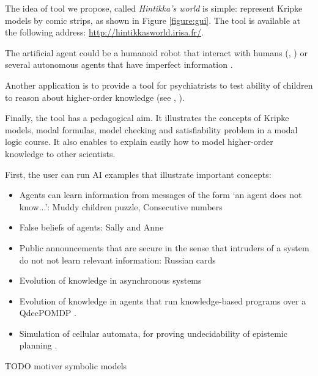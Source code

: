 \documentclass{article}
\begin{document}
The idea of tool we propose, called \emph{Hintikka's world} is simple: represent Kripke models by comic strips, as shown in Figure \ref{figure:gui}. The tool is available at the following address:
\url{http://hintikkasworld.irisa.fr/}. 

The artificial agent could be a humanoid robot that interact with humans (\cite{DBLP:journals/arobots/Scassellati02}, \cite{DBLP:conf/hri/DevinA16}) or several autonomous agents that have imperfect information \cite{AAAI2018kbps}.


Another application is to provide a tool for psychiatrists to test ability of children to reason about higher-order knowledge (see \cite{DBLP:conf/cogsci/ArslanVTH15}, \cite{wimmer1983beliefs}).

Finally, the tool has a pedagogical aim. It illustrates the concepts of Kripke models, modal formulas, model checking and satisfiability problem in a modal logic course. It also enables to explain easily 
how to model higher-order knowledge to other scientists.

First, the user can run AI examples that illustrate important concepts:

\begin{itemize}
	\item Agents can learn information from messages of the form `an agent does not know...': Muddy children puzzle, Consecutive numbers \cite{van2015one}
	\item False beliefs of agents: Sally and Anne \cite{wimmer1983beliefs}
	\item Public announcements that are secure in the sense that intruders of a system do not not learn relevant information: Russian cards \cite{DBLP:journals/sLogica/Ditmarsch03}
	\item Evolution of knowledge in asynchronous systems \cite{knight_maubert_schwarzentruber_2017}
	\item Evolution of knowledge in agents that run knowledge-based programs over a QdecPOMDP \cite{AAAI2018kbps}.
	\item Simulation of cellular automata, for proving undecidability of epistemic planning \cite{ijcai2018SmallUndecidableEpistemicPlanning}.
\end{itemize} 

TODO motiver symbolic models

\end{document}
